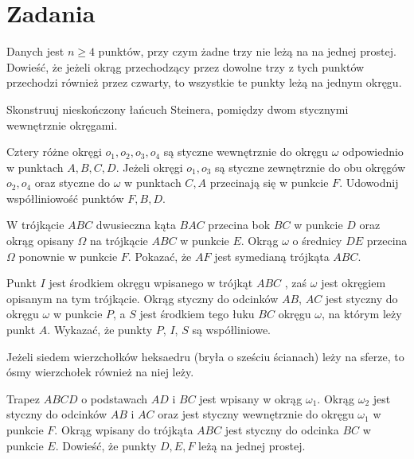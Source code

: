 \documentclass{lecture-kuznia}
\begin{document}
\section{Zadania}

\begin{problem}
Danych jest $n \geq 4$ punktów, przy czym żadne trzy nie leżą na na jednej prostej. Dowieść, że jeżeli okrąg przechodzący przez dowolne trzy z tych punktów przechodzi również przez czwarty, to wszystkie te punkty leżą na jednym okręgu. 
\end{problem}

\begin{problem}
Skonstruuj nieskończony łańcuch Steinera, pomiędzy dwom stycznymi wewnętrznie okręgami.
\end{problem}

\begin{problem}
Cztery różne okręgi $o_1, o_2, o_3, o_4$ są styczne wewnętrznie do okręgu $\omega$ odpowiednio w punktach $A,B,C,D$. Jeżeli okręgi $o_1, o_3$ są styczne zewnętrznie do obu okręgów $o_2, o_4$ oraz styczne do $\omega$ w punktach $C,A$ przecinają się w punkcie $F$. Udowodnij współliniowość punktów $F, B, D$.
\end{problem}

\begin{problem}
W trójkącie $ABC$ dwusieczna kąta $BAC$ przecina bok $BC$ w punkcie $D$ oraz okrąg opisany $\Omega$ na trójkącie $ABC$ w punkcie $E$. Okrąg $\omega$ o średnicy $DE$ przecina $\Omega$ ponownie w punkcie $F$. Pokazać, że $AF$ jest symedianą trójkąta $ABC$.
\end{problem}

\begin{problem}
Punkt $I$ jest środkiem okręgu wpisanego w trójkąt $ABC$ , zaś $\omega$ jest okręgiem opisanym na tym trójkącie. Okrąg styczny do odcinków $AB$, $AC$ jest styczny do okręgu $\omega$ w punkcie $P$, a $S$ jest środkiem tego łuku $BC$ okręgu $\omega$, na którym leży punkt $A$. Wykazać, że punkty $P$, $I$, $S$ są współliniowe.
\end{problem}

\begin{problem}
Jeżeli siedem wierzchołków heksaedru (bryła o sześciu ścianach) leży na sferze, to ósmy wierzchołek również na niej leży.
\end{problem}

\begin{problem}
Trapez $ABCD$ o podstawach $AD$ i $BC$ jest wpisany w okrąg $\omega_1$. Okrąg $\omega_2$ jest styczny do odcinków $AB$ i $AC$ oraz jest styczny wewnętrznie do okręgu $\omega_1$ w punkcie $F$. Okrąg wpisany do trójkąta $ABC$ jest styczny do odcinka $BC$ w punkcie $E$. Dowieść, że punkty $D, E, F$ leżą na jednej prostej.
\end{problem}
\end{document}
